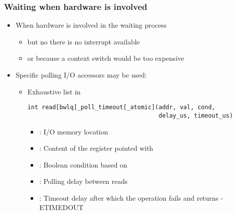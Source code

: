 \begin{frame}[fragile]
  \frametitle{Waiting when hardware is involved}
  \begin{itemize}
  \item When hardware is involved in the waiting process
    \begin{itemize}
    \item but no there is no interrupt available
    \item or because a context switch would be too expensive
    \end{itemize}
  \item Specific polling I/O accessors may be used:
    \begin{itemize}
    \item Exhaustive list in 
      \begin{verbatim}
int read[bwlq]_poll_timeout[_atomic](addr, val, cond,
                                     delay_us, timeout_us)
      \end{verbatim}
        \begin{itemize}
        \item {}: I/O memory location
        \item {}: Content of the register pointed with
        \item {}: Boolean condition based on 
        \item {}: Polling delay between reads
        \item {}: Timeout delay after which the operation
          fails and returns -ETIMEDOUT
        \end{itemize}
    \end{itemize}
  \end{itemize}
\end{frame}
